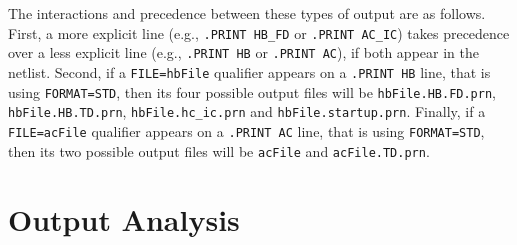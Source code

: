 The interactions and precedence between these types of output are as follows.  
First, a more explicit line (e.g., \texttt{.PRINT HB\_FD} or 
\texttt{.PRINT AC\_IC}) takes precedence over a less explicit line (e.g., 
\texttt{.PRINT HB} or \texttt{.PRINT AC}), if both appear in the netlist.
Second, if a \texttt{FILE=hbFile} qualifier appears on a \texttt{.PRINT HB}
line, that is using \texttt{FORMAT=STD}, then its four possible output files 
will be \texttt{hbFile.HB.FD.prn}, \texttt{hbFile.HB.TD.prn},
\texttt{hbFile.hc\_ic.prn} and \texttt{hbFile.startup.prn}.  Finally, if a
\texttt{FILE=acFile} qualifier appears on a \texttt{.PRINT AC} line, that 
is using \texttt{FORMAT=STD}, then its two possible output files will 
be \texttt{acFile} and \texttt{acFile.TD.prn}.    
  
\section{Output Analysis}
\label{Output_Analysis}

